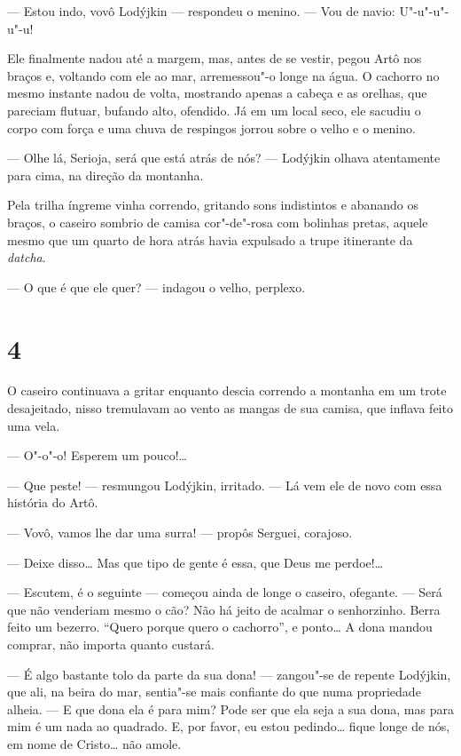 --- Estou indo, vovô Lodýjkin --- respondeu o menino. --- Vou de navio:
U"-u"-u"-u"-u!

Ele finalmente nadou até a margem, mas, antes de se vestir, pegou Artô
nos braços e, voltando com ele ao mar, arremessou"-o longe na água. O
cachorro no mesmo instante nadou de volta, mostrando apenas a cabeça e
as orelhas, que pareciam flutuar, bufando alto, ofendido. Já em um local
seco, ele sacudiu o corpo com força e uma chuva de respingos jorrou
sobre o velho e o menino.

--- Olhe lá, Serioja, será que está atrás de nós? --- Lodýjkin olhava
atentamente para cima, na direção da montanha.

Pela trilha íngreme vinha correndo, gritando sons indistintos e abanando
os braços, o caseiro sombrio de camisa cor"-de"-rosa com bolinhas pretas,
aquele mesmo que um quarto de hora atrás havia expulsado a trupe
itinerante da \emph{datcha}.

--- O que é que ele quer? --- indagou o velho, perplexo.

\section{4}

O caseiro continuava a gritar enquanto descia correndo a montanha em um
trote desajeitado, nisso tremulavam ao vento as mangas de sua camisa,
que inflava feito uma vela.

--- O"-o"-o! Esperem um pouco!\ldots{}

--- Que peste! --- resmungou Lodýjkin, irritado. --- Lá vem ele de novo
com essa história do Artô.

--- Vovô, vamos lhe dar uma surra! --- propôs Serguei, corajoso.

--- Deixe disso\ldots{} Mas que tipo de gente é essa, que Deus me perdoe!\ldots{}

--- Escutem, é o seguinte --- começou ainda de longe o caseiro,
ofegante. --- Será que não venderiam mesmo o cão? Não há jeito de
acalmar o senhorzinho. Berra feito um bezerro. ``Quero porque quero o
cachorro'', e ponto\ldots{} A dona mandou comprar, não importa quanto
custará.

--- É algo bastante tolo da parte da sua dona! --- zangou"-se de repente
Lodýjkin, que ali, na beira do mar, sentia"-se mais confiante do que numa
propriedade alheia. --- E que dona ela é para mim? Pode ser que ela seja
a sua dona, mas para mim é um nada ao quadrado. E, por favor, eu estou
pedindo\ldots{} fique longe de nós, em nome de Cristo\ldots{} não amole.

